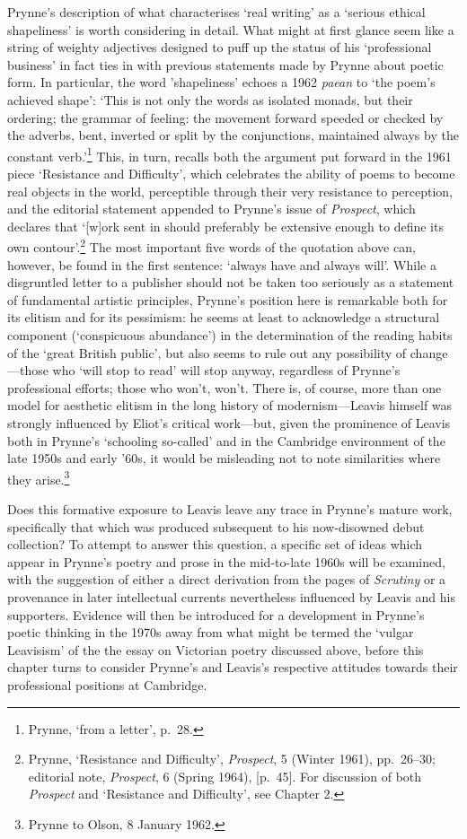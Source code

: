 \documentclass[]{article}
\begin{document}
Prynne's description of what characterises `real writing' as a `serious
ethical shapeliness' is worth considering in detail. What might at first
glance seem like a string of weighty adjectives designed to puff up the
status of his `professional business' in fact ties in with previous
statements made by Prynne about poetic form. In particular, the word
'shapeliness' echoes a 1962 \emph{paean} to `the poem's achieved shape':
`This is not only the words as isolated monads, but their ordering; the
grammar of feeling: the movement forward speeded or checked by the
adverbs, bent, inverted or split by the conjunctions, maintained always
by the constant verb.'\footnote{Prynne, `from a letter', p.~28.} This,
in turn, recalls both the argument put forward in the 1961 piece
`Resistance and Difficulty', which celebrates the ability of poems to
become real objects in the world, perceptible through their very
resistance to perception, and the editorial statement appended to
Prynne's issue of \emph{Prospect}, which declares that `{[}w{]}ork sent
in should preferably be extensive enough to define its own
contour'.\footnote{Prynne, `Resistance and Difficulty', \emph{Prospect},
  5 (Winter 1961), pp.~26--30; editorial note, \emph{Prospect}, 6
  (Spring 1964), {[}p.~45{]}. For discussion of both \emph{Prospect} and
  `Resistance and Difficulty', see Chapter 2.} The most important five
words of the quotation above can, however, be found in the first
sentence: `always have and always will'. While a disgruntled letter to a
publisher should not be taken too seriously as a statement of
fundamental artistic principles, Prynne's position here is remarkable
both for its elitism and for its pessimism: he seems at least to
acknowledge a structural component (`conspicuous abundance') in the
determination of the reading habits of the `great British public', but
also seems to rule out any possibility of change---those who `will stop
to read' will stop anyway, regardless of Prynne's professional efforts;
those who won't, won't. There is, of course, more than one model for
aesthetic elitism in the long history of modernism---Leavis himself was
strongly influenced by Eliot's critical work---but, given the prominence
of Leavis both in Prynne's `schooling so-called' and in the Cambridge
environment of the late 1950s and early '60s, it would be misleading not
to note similarities where they arise.\footnote{Prynne to Olson, 8
  January 1962.}

Does this formative exposure to Leavis leave any trace in Prynne's
mature work, specifically that which was produced subsequent to his
now-disowned debut collection? To attempt to answer this question, a
specific set of ideas which appear in Prynne's poetry and prose in the
mid-to-late 1960s will be examined, with the suggestion of either a
direct derivation from the pages of \emph{Scrutiny} or a provenance in
later intellectual currents nevertheless influenced by Leavis and his
supporters. Evidence will then be introduced for a development in
Prynne's poetic thinking in the 1970s away from what might be termed the
`vulgar Leavisism' of the the essay on Victorian poetry discussed above,
before this chapter turns to consider Prynne's and Leavis's respective
attitudes towards their professional positions at Cambridge.
\end{document}
